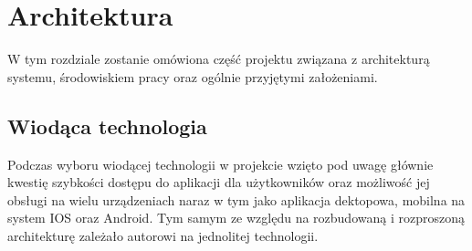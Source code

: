 \chapter{Architektura}
\label{ch:funplenop}

W tym rozdziale zostanie omówiona część projektu związana z architekturą systemu, środowiskiem pracy oraz ogólnie przyjętymi założeniami.

\section{Wiodąca technologia}

Podczas wyboru wiodącej technologii w projekcie wzięto pod uwagę głównie kwestię szybkości dostępu do aplikacji dla użytkowników oraz możliwość jej obsługi na wielu urządzeniach naraz w tym jako aplikacja dektopowa, mobilna na system IOS oraz Android. Tym samym ze względu na rozbudowaną i rozproszoną architekturę zależało autorowi na jednolitej technologii.

